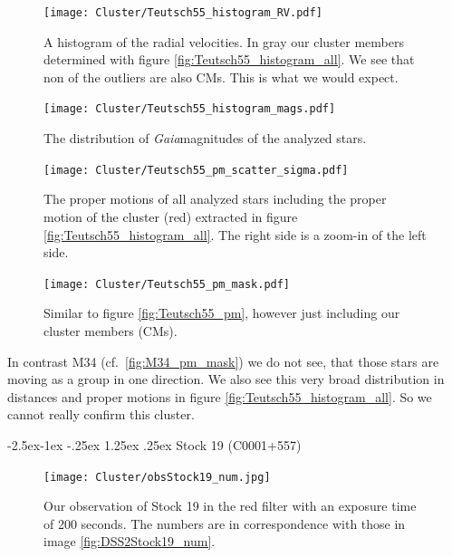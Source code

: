 \documentclass{article}
\makeatletter
\renewcommand\paragraph{\@startsection{paragraph}{4}{\z@}%
            {-2.5ex\@plus -1ex \@minus -.25ex}%
            {1.25ex \@plus .25ex}%
            {\normalfont\normalsize\bfseries}}
\makeatother
\begin{document}
\begin{figure}[H]
  \centering
    \texttt{[image: Cluster/Teutsch55\_histogram\_RV.pdf]}
  \caption{A histogram of the radial velocities. In gray our cluster members determined with figure \ref{fig:Teutsch55_histogram_all}. We see that non of the outliers are also CMs. This is what we would expect.}
  \label{fig:Teutsch55_histogram_RV}
\end{figure}

\begin{figure}[H]
  \centering
    \texttt{[image: Cluster/Teutsch55\_histogram\_mags.pdf]}
  \caption{The distribution of \textit{Gaia}magnitudes of the analyzed stars.}
  \label{fig:Teutsch55_histogram_mags}
\end{figure}

\begin{figure}[H]
  \centering
    \texttt{[image: Cluster/Teutsch55\_pm\_scatter\_sigma.pdf]}
  \caption{The proper motions of all analyzed stars including the proper motion of the cluster (red) extracted in figure \ref{fig:Teutsch55_histogram_all}. The right side is a zoom-in of the left side.}
  \label{fig:Teutsch55_pm_scatter_sigma}
\end{figure}

\begin{figure}[H]
  \centering
    \texttt{[image: Cluster/Teutsch55\_pm\_mask.pdf]}
  \caption{Similar to figure \ref{fig:Teutsch55_pm}, however just including our cluster members (CMs).}
  \label{fig:Teutsch55_pm_mask}
\end{figure}

In contrast M34 (cf.~\ref{fig:M34_pm_mask}) we do not see, that those stars are moving as a group in one direction. We also see this very broad distribution in distances and proper motions in figure \ref{fig:Teutsch55_histogram_all}. So we cannot really confirm this cluster.

\paragraph{Stock 19 (C0001+557)}

\begin{figure}[H]
  \centering
    \texttt{[image: Cluster/obsStock19\_num.jpg]}
  \caption{Our observation of Stock 19 in the red filter with an exposure time of 200 seconds. The numbers are in correspondence with those in image \ref{fig:DSS2Stock19_num}.}
  \label{fig:obsStock19_num}
\end{figure}
\end{document}
